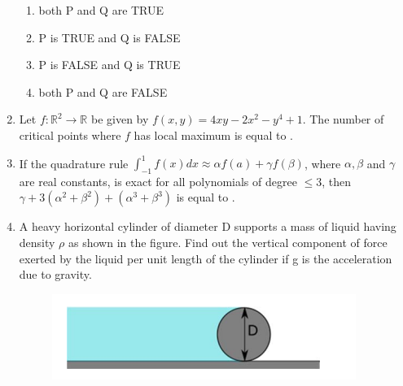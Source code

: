 \documentclass[a4paper,10pt]{article}
\begin{document}
\begin{enumerate}
\hfill{}
\begin{enumerate}
    \item both P and Q are TRUE
    \item P is TRUE and Q is FALSE
    \item P is FALSE and Q is TRUE
    \item both P and Q are FALSE
\end{enumerate}

\item Let $f \colon \mathbb{R}^2 \to \mathbb{R}$ be given by $f(x,y) = 4xy - 2x^2 - y^4 + 1$. The number of critical points where $f$ has local maximum is equal to \underline{\hspace{2cm}}.

\hfill{}

\item If the quadrature rule
$\int_{-1}^{1} f(x)dx \approx \alpha f(a) + \gamma f(\beta)$,
where $\alpha, \beta$ and $\gamma$ are real constants, is exact for all polynomials of degree $\leq 3$, then $\gamma + 3(\alpha^2 + \beta^2) + (\alpha^3 + \beta^3)$ is equal to \underline{\hspace{2cm}}.

\hfill{}

\item A heavy horizontal cylinder of diameter D supports a mass of liquid having density $\rho$ as shown in the figure. Find out the vertical component of force exerted by the liquid per unit length of the cylinder if g is the acceleration due to gravity.
\begin{figure}[H]
    \centering
    \includegraphics[width=0.4\columnwidth]{q22.png}
    \caption*{}
    \label{fig:q22}
\end{figure}

\hfill{}
\begin{enumerate}
\end{enumerate}


\end{enumerate}
\end{document}
